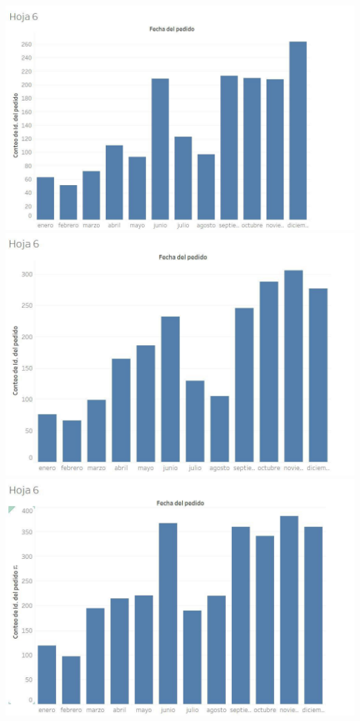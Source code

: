 \documentclass{article}
\begin{document}
\includegraphics[scale=0.25]{imagenes/2015.jpg} 
\includegraphics[scale=0.25]{imagenes/2016.jpg} 
\includegraphics[scale=0.25]{imagenes/2017.jpg} 
\end{document}
